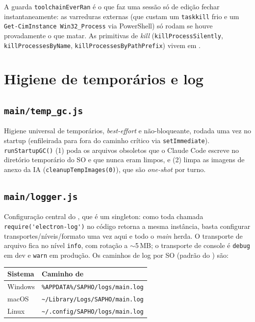 A guarda \lstinline|toolchainEverRan| é o que faz uma sessão só de edição fechar
instantaneamente: as varreduras externas (que custam um \lstinline|taskkill| frio
e um \lstinline|Get-CimInstance Win32_Process| via PowerShell) só rodam se houve
provadamente o que matar. As primitivas de \emph{kill} (\lstinline|killProcessSilently|,
\lstinline|killProcessesByName|, \lstinline|killProcessesByPathPrefix|) vivem em
.

\section{Higiene de temporários e log}
\label{sec:05-tempgc-log}

\subsection{\texttt{main/temp\_gc.js}}

Higiene universal de temporários, \emph{best-effort} e não-bloqueante, rodada uma
vez no startup (enfileirada para fora do caminho crítico via
\lstinline|setImmediate|). \lstinline|runStartupGC()| (1) poda os arquivos
 obsoletos que o Claude Code escreve no diretório
temporário do SO e que nunca eram limpos, e (2) limpa as imagens de anexo da IA
(\lstinline|cleanupTempImages(0)|), que são \emph{one-shot} por turno.

\subsection{\texttt{main/logger.js}}

Configuração central do
\href{https://github.com/megahertz/electron-log}{}, que é um
singleton: como toda chamada \lstinline|require('electron-log')| no código retorna
a mesma instância, basta configurar transportes/níveis/formato uma vez aqui e todo
o \emph{main} herda. O transporte de arquivo fica no nível \lstinline|info|, com
rotação a $\sim$5\,MB; o transporte de console é \lstinline|debug| em dev e
\lstinline|warn| em produção. Os caminhos de log por SO (padrão do
) são:

\begin{tabularx}{\linewidth}{Y Z}
  \toprule
  \textbf{Sistema} & \textbf{Caminho de } \\
  \midrule
  Windows & \texttt{\%APPDATA\%/SAPHO/logs/main.log} \\
  macOS   & \texttt{\textasciitilde/Library/Logs/SAPHO/main.log} \\
  Linux   & \texttt{\textasciitilde/.config/SAPHO/logs/main.log} \\
  \bottomrule
\end{tabularx}

